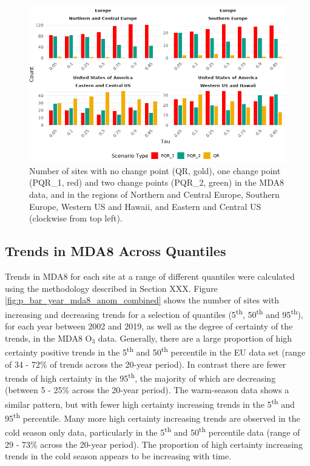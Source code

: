 \documentclass[journal abbreviation, manuscript]{copernicus}
\begin{document}
\begin{figure}[h!]
\includegraphics[width=12cm]{test_figures/test_number_of_sites_scenarioType_tau_mda8_all.png}
\caption{Number of sites with no change point (QR, gold), one change point (PQR\_1, red) and two change points (PQR\_2, green) in the MDA8 data, and in the regions of Northern and Central Europe, Southern Europe, Western US and Hawaii, and Eastern and Central US (clockwise from top left).}
\label{fig:test_scenarioType_tau_count}
\end{figure}

\subsection{Trends in MDA8 Across Quantiles} \label{sect:new_mda8_trends}

Trends in MDA8 for each site at a range of different quantiles were calculated using the methodology described in Section XXX. Figure \ref{fig:p_bar_year_mda8_anom_combined} shows the number of sites with increasing and decreasing trends for a selection of quantiles (5\textsuperscript{th}, 50\textsuperscript{th} and 95\textsuperscript{th}), for each year between 2002 and 2019, as well as the degree of certainty of the trends, in the MDA8 O$_3$ data. Generally, there are a large proportion of high certainty positive trends in the 5\textsuperscript{th} and 50\textsuperscript{th} percentile in the EU data set (range of 34 - 72\% of trends across the 20-year period). In contrast there are fewer trends of high certainty in the 95\textsuperscript{th}, the majority of which are decreasing (between 5 - 25\% across the 20-year period). The warm-season data shows a similar pattern, but with fewer high certainty increasing trends in the 5\textsuperscript{th} and 95\textsuperscript{th} percentile. Many more high certainty increasing trends are observed in the cold season only data, particularly in the 5\textsuperscript{th} and 50\textsuperscript{th} percentile data (range of 29 - 73\% across the 20-year period). The proportion of high certainty increasing trends in the cold season appears to be increasing with time.
\end{document}

